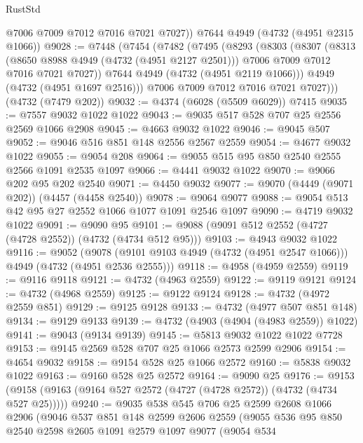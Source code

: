 \begin{lexlean}{RustStd}
\begin{coremodule}
{\begin{coremodule}
{{{{{{{{{{{{{{        @7006
        @7009
        @7012
        @7016
        @7021
        @7027))
    @7644
    @4949
    (@4732 (@4951 @2315 @1066))
@9028 := @7448
    (@7454
      (@7482
        (@7495
          (@8293
            (@8303
              (@8307
                (@8313
                  (@8650 @8988 @4949 (@4732 (@4951 @2127 @2501)))
                  @7006
                  @7009
                  @7012
                  @7016
                  @7021
                  @7027))
              @7644
              @4949
              (@4732 (@4951 @2119 @1066)))
            @4949
            (@4732 (@4951 @1697 @2516)))
          @7006
          @7009
          @7012
          @7016
          @7021
          @7027)))
    (@4732 (@7479 @202))
@9032 := @4374 (@6028 (@5509 @6029)) @7415
@9035 := @7557 @9032 @1022 @1022
@9043 := @9035 @517 @528 @707 @25 @2556 @2569 @1066 @2908
@9045 := @4663 @9032 @1022
@9046 := @9045 @507
@9052 := @9046 @516 @851 @148 @2556 @2567 @2559
@9054 := @4677 @9032 @1022
@9055 := @9054 @208
@9064 := @9055 @515 @95 @850 @2540 @2555 @2566 @1091 @2535 @1097
@9066 := @4441 @9032 @1022
@9070 := @9066 @202 @95 @202 @2540
@9071 := @4450 @9032
@9077 := @9070 (@4449 (@9071 @202)) (@4457 (@4458 @2540))
@9078 := @9064 @9077
@9088 := @9054 @513 @42 @95 @27 @2552 @1066 @1077 @1091 @2546 @1097
@9090 := @4719 @9032 @1022
@9091 := @9090 @95
@9101 := @9088 (@9091 @512 @2552 (@4727 (@4728 @2552)) (@4732 (@4734 @512 @95)))
@9103 := @4943 @9032 @1022
@9116 := @9052
    (@9078 (@9101 @9103 @4949 (@4732 (@4951 @2547 @1066))) @4949 (@4732 (@4951 @2536 @2555)))
@9118 := @4958 (@4959 @2559)
@9119 := @9116 @9118
@9121 := @4732 (@4963 @2559)
@9122 := @9119 @9121
@9124 := @4732 (@4968 @2559)
@9125 := @9122 @9124
@9128 := @4732 (@4972 @2559 @851)
@9129 := @9125 @9128
@9133 := @4732 (@4977 @507 @851 @148)
@9134 := @9129 @9133
@9139 := @4732 (@4903 (@4904 (@4983 @2559)) @1022)
@9141 := @9043 (@9134 @9139)
@9145 := @5813 @9032 @1022 @1022 @7728
@9153 := @9145 @2569 @528 @707 @25 @1066 @2573 @2599 @2906
@9154 := @4654 @9032
@9158 := @9154 @528 @25 @1066 @2572
@9160 := @5838 @9032 @1022
@9163 := @9160 @528 @25 @2572
@9164 := @9090 @25
@9176 := @9153 (@9158 (@9163 (@9164 @527 @2572 (@4727 (@4728 @2572)) (@4732 (@4734 @527 @25)))))
@9240 := @9035
    @538
    @545
    @706
    @25
    @2599
    @2608
    @1066
    @2906
    (@9046
      @537
      @851
      @148
      @2599
      @2606
      @2559
      (@9055
        @536
        @95
        @850
        @2540
        @2598
        @2605
        @1091
        @2579
        @1097
        @9077
        (@9054
          @534
}}}}}}}}}}}}}}
\end{coremodule}}
\end{coremodule}
\end{lexlean}
